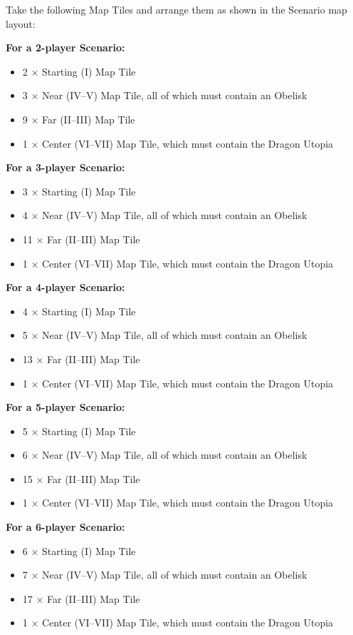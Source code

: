 \begin{multicols*}{2}
Take the following Map Tiles and arrange them as shown in the Scenario map layout:

\textbf{For a 2-player Scenario:}
\begin{itemize}
  \item 2 × Starting (I) Map Tile
  \item 3 × Near (IV--V) Map Tile, all of which must contain an Obelisk
  \item 9 × Far (II--III) Map Tile
  \item 1 × Center (VI--VII) Map Tile, which must contain the Dragon Utopia
\end{itemize}

\textbf{For a 3-player Scenario:}
\begin{itemize}
  \item 3 × Starting (I) Map Tile
  \item 4 × Near (IV--V) Map Tile, all of which must contain an Obelisk
  \item 11 × Far (II--III) Map Tile
  \item 1 × Center (VI--VII) Map Tile, which must contain the Dragon Utopia
\end{itemize}

\textbf{For a 4-player Scenario:}
\begin{itemize}
  \item 4 × Starting (I) Map Tile
  \item 5 × Near (IV--V) Map Tile, all of which must contain an Obelisk
  \item 13 × Far (II--III) Map Tile
  \item 1 × Center (VI--VII) Map Tile, which must contain the Dragon Utopia
\end{itemize}

\textbf{For a 5-player Scenario:}
\begin{itemize}
  \item 5 × Starting (I) Map Tile
  \item 6 × Near (IV--V) Map Tile, all of which must contain an Obelisk
  \item 15 × Far (II--III) Map Tile
  \item 1 × Center (VI--VII) Map Tile, which must contain the Dragon Utopia
\end{itemize}

\textbf{For a 6-player Scenario:}
\begin{itemize}
  \item 6 × Starting (I) Map Tile
  \item 7 × Near (IV--V) Map Tile, all of which must contain an Obelisk
  \item 17 × Far (II--III) Map Tile
  \item 1 × Center (VI--VII) Map Tile, which must contain the Dragon Utopia
\end{itemize}


\end{multicols*}
